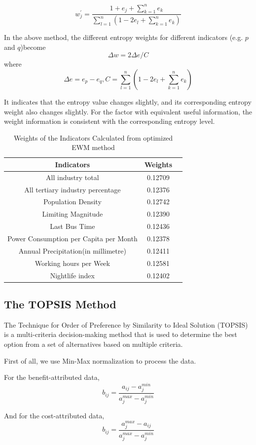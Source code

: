 $$w_j^{'}=\frac{1+e_j+\sum_{k=1}^ne_k}{\sum_{l=1}^n(1-2e_l+\sum_{k=1}^ne_k)}$$

In the above method, the different entropy weights for different indicators (e.g. $p$ and $q$)become $$\Delta w=2\Delta e/C$$ where $$\Delta e=e_p-e_q,C=\sum_{l=1}^n(1-2e_l+\sum_{k=1}^ne_k)$$

It indicates that the entropy value changes slightly, and its corresponding entropy weight also changes slightly. For the factor with equivalent useful information, the weight information is consistent with the corresponding entropy level.


\begin{table}[H] \centering
    \caption{Weights of the Indicators Calculated from optimized EWM method}
    \begin{tabular}{ccl}
        \toprule
        Indicators & Weights\\ \hline
        All industry total & 0.12709\\
        All tertiary industry percentage & 0.12376\\
        Population Density & 0.12742\\
        Limiting Magnitude & 0.12390\\
        Last Bus Time & 0.12436\\
        Power Consumption per Capita per Month & 0.12378\\
        Annual Precipitation(in millimetre) & 0.12411\\
        Working hours per Week & 0.12581\\
        Nightlife index & 0.12402\\
        \bottomrule
    \end{tabular}
\end{table}


\subsection{The TOPSIS Method}

The Technique for Order of Preference by Similarity to Ideal Solution (TOPSIS) is a multi-criteria decision-making method that is used to determine the best option from a set of alternatives based on multiple criteria. 

First of all, we use Min-Max normalization to process the data.

For the benefit-attributed data,
$$b_{ij}=\frac{a_{ij}-a_j^{min}}{a_j^{max}-a_j^{min}}$$

And for the cost-attributed data,
$$b_{ij}=\frac{a_{j}^{max}-a_{ij}}{a_j^{max}-a_j^{min}}$$

